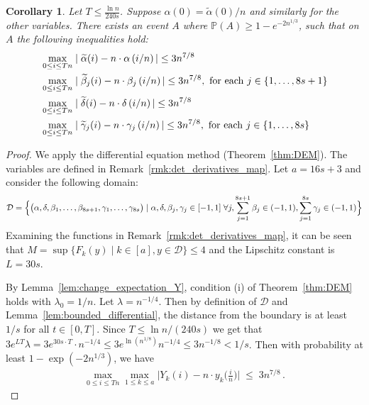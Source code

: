 \documentclass[a4paper,12pt]{article}
\newtheorem{corollary}{Corollary}
\newcommand\bigpar[1]{\bigl(#1\bigr)}
\newcommand\bigabs[1]{\bigl|#1\bigr|}
\begin{document}
\begin{corollary} \label{cor:warnke_bounds_beta_j}
	Let $ T \leq \frac{\ln{n}}{240s}$.
	Suppose $\alpha(0) = \widetilde{\alpha}(0) / n $ and similarly for the other variables. There exists an event $A$ where $\mathbb{P}(A) \geq 1 - e^{-2n^{1/3}}$, such that on $A$ the following inequalities hold:
	\begin{align}
	& \max_{0 \leq i \leq Tn} \mid \widetilde{\alpha}(i) - n \cdot \alpha\left({i}/{n}\right)| \leq 3 n^{7/8} \notag \\
	& \max_{0 \leq i \leq Tn} \mid \widetilde{\beta}_j(i) - n \cdot \beta_j\left({i}/{n}\right)| \leq 3 n^{7/8}, \mbox{ for each } j \in \{1, \ldots, 8s+1\}\notag  \\
	& \max_{0 \leq i \leq Tn} \mid \widetilde{\delta}(i) - n \cdot \delta\left({i}/{n}\right)| \leq 3 n^{7/8} \notag \\
	& \max_{0 \leq i \leq Tn} \mid \widetilde{\gamma}_j(i) - n \cdot \gamma_j\left({i}/{n}\right)| \leq 3 n^{7/8}, \mbox{ for each } j \in \{1, \ldots, 8s\} \notag
	\end{align}
\end{corollary}
\begin{proof}
	We apply the differential equation method (Theorem~\ref{thm:DEM}). The variables are defined in Remark~\ref{rmk:det_derivatives_map}.
Let $a = 16s+3$ and consider the following domain:
\begin{align}
\mathcal{D}  = \Bigl\{ \bigl(\alpha, \delta, \beta_1, \ldots, \beta_{8s+1}, \gamma_1, \ldots, \gamma_{8s} \bigr) \mid
\alpha, \delta, \beta_j, \gamma_j \in [-1, 1] \; \forall j,  \sum_{j=1}^{8s+1} \beta_j \in (-1,1), \sum_{j=1}^{8s} \gamma_j \in (-1,1)  \Bigr\}
\end{align}
Examining the functions in Remark~\ref{rmk:det_derivatives_map}, it can be seen that $M = \sup\{F_k(y) \mid k \in [a], y \in \mathcal{D}\} \leq 4$ and the Lipschitz constant is $L = 30s$.

By Lemma~\ref{lem:change_expectation_Y}, condition (i) of Theorem~\ref{thm:DEM} holds with $\lambda_0 = 1/n$. Let $\lambda = n^{-1/4}$. Then by definition of $\mathcal{D}$ and Lemma~\ref{lem:bounded_differential}, the distance from the boundary is at least $1/s$ for all $t \in [0, T]$. Since
$
T \leq {\ln{n}}/(240s) %
$
we get that $3e^{LT}\lambda = 3e^{30s \cdot T} \cdot n^{-1/4} \leq 3 e^{\ln\left({n^{1/8}}\right)} n^{-1/4} \leq 3 n^{-1/8} < 1/s$.
Then with probability at least $1 - \exp\left(-2n^{1/3}\right)$, we have
\begin{align}%
\max_{0 \le i \le T n} \max_{1 \le k \le a}\bigabs{Y_k(i)-n \cdot y_k\bigpar{\tfrac{i}{n}}} \; \leq \; 3 n^{7/8} \,.
\end{align}
\end{proof}
\end{document}
